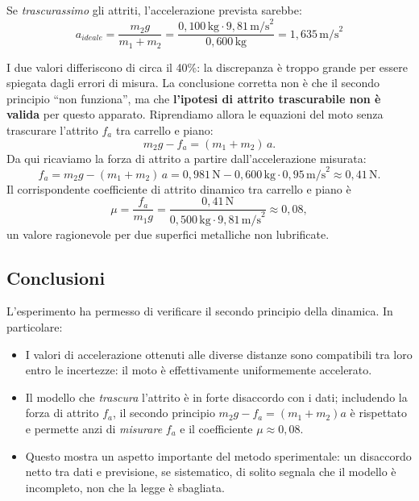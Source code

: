 Se \emph{trascurassimo} gli attriti, l'accelerazione prevista sarebbe:
\begin{equation}
    a_{ideale} = \frac{m_2g}{m_1 + m_2} = \frac{0,100\,\text{kg} \cdot 9,81\,\text{m/s}^2}{0,600\,\text{kg}} = 1,635\,\text{m/s}^2
\end{equation}

I due valori differiscono di circa il 40\%: la discrepanza è troppo grande per essere spiegata dagli errori di misura. La conclusione corretta non è che il secondo principio ``non funziona'', ma che \textbf{l'ipotesi di attrito trascurabile non è valida} per questo apparato. Riprendiamo allora le equazioni del moto senza trascurare l'attrito $f_a$ tra carrello e piano:
\begin{equation}
    m_2 g - f_a = (m_1 + m_2)\,a .
\end{equation}
Da qui ricaviamo la forza di attrito a partire dall'accelerazione misurata:
\begin{equation}
    f_a = m_2 g - (m_1 + m_2)\,a = 0,981\,\text{N} - 0,600\,\text{kg}\cdot 0,95\,\text{m/s}^2 \approx 0,41\,\text{N}.
\end{equation}
Il corrispondente coefficiente di attrito dinamico tra carrello e piano è
\begin{equation}
    \mu = \frac{f_a}{m_1 g} = \frac{0,41\,\text{N}}{0,500\,\text{kg}\cdot 9,81\,\text{m/s}^2} \approx 0,08,
\end{equation}
un valore ragionevole per due superfici metalliche non lubrificate.

\subsection{Conclusioni}
L'esperimento ha permesso di verificare il secondo principio della dinamica. In particolare:

\begin{itemize}
    \item I valori di accelerazione ottenuti alle diverse distanze sono compatibili tra loro entro le incertezze: il moto è effettivamente uniformemente accelerato.
    \item Il modello che \emph{trascura} l'attrito è in forte disaccordo con i dati; includendo la forza di attrito $f_a$, il secondo principio $m_2 g - f_a = (m_1+m_2)a$ è rispettato e permette anzi di \emph{misurare} $f_a$ e il coefficiente $\mu \approx 0,08$.
    \item Questo mostra un aspetto importante del metodo sperimentale: un disaccordo netto tra dati e previsione, se sistematico, di solito segnala che il modello è incompleto, non che la legge è sbagliata.
\end{itemize}

